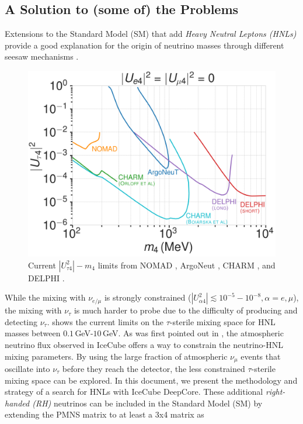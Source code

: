 \subsection{A Solution to (some of) the Problems}


Extensions to the Standard Model (SM) that add \textit{Heavy Neutral Leptons (HNLs)} provide a good explanation for the origin of neutrino masses through different seesaw mechanisms .
\begin{figure}
  \includegraphics{figures/hnl_simulation/theory/UtauN_custom_plots_LF_grid_white.png}
  \caption[Current $|U_{\tau4}^2|-m_4$ limits]{Current $|U_{\tau4}^2|-m_4$ limits from NOMAD \cite{NOMAD:2001eyx}, ArgoNeut \cite{ArgoNeuT:2021clc}, CHARM \cite{Orloff:2002de, Boiarska:2021yho}, and DELPHI \cite{DELPHI:1996qcc}.}
\end{figure}
While the mixing with $\nu_{e/\mu}$ is strongly constrained ($|U_{\alpha4}^2| \lesssim 10^{-5}-10^{-8}, \alpha=e,\mu$), the mixing with $\nu_{\tau}$ is much harder to probe due to the difficulty of producing and detecting $\nu_\tau$.  shows the current limits on the $\tau$-sterile mixing space for HNL masses between $0.1$\,GeV-$10$\,GeV. As was first pointed out in , the atmospheric neutrino flux observed in IceCube offers a way to constrain the neutrino-HNL mixing parameters. By using the large fraction of atmospheric $\nu_{\mu}$ events that oscillate into $\nu_{\tau}$ before they reach the detector, the less constrained $\tau$-sterile mixing space can be explored. In this document, we present the methodology and strategy of a search for HNLs with IceCube DeepCore. These additional \textit{right-handed (RH)} neutrinos can be included in the Standard Model (SM) by extending the PMNS matrix to at least a 3x4 matrix as
